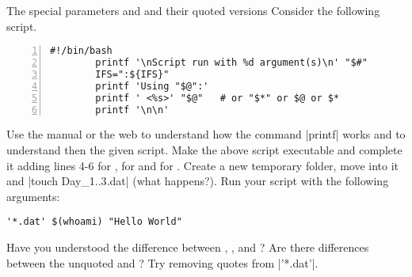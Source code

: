 
\begin{exercise}[Instructive]{The special parameters \bash{*} and \bash{\@} and their quoted versions}
    Consider the following script.
    \begin{lstlisting}[style=MyBash, numbers=left]
        #!/bin/bash
        printf '\nScript run with %d argument(s)\n' "$#"
        IFS=":${IFS}"
        printf 'Using "$@":'
        printf ' <%s>' "$@"   # or "$*" or $@ or $*
        printf '\n\n'
    \end{lstlisting}
    Use the manual or the web to understand how the command \bash|printf| works and to understand then the given script.
    Make the above script executable and complete it adding lines 4-6 for , for  and for \bash{$*}.
    Create a new temporary folder, move into it and \bash|touch Day_{1..3}.dat| (what happens?).
    Run your script with the following arguments:
    \begin{lstlisting}[style=MyBash]
        '*.dat' $(whoami) "Hello World"
    \end{lstlisting}
    Have you understood the difference between , ,  and \bash{$*}?
    Are there differences between the unquoted  and \bash{$*}?
    Try removing quotes from \bash|'*.dat'|.
\end{exercise}